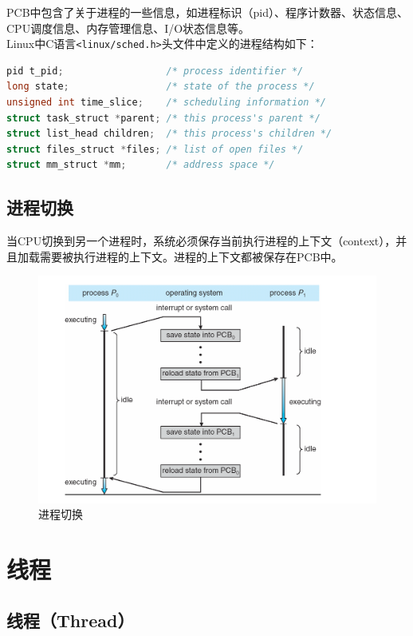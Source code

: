PCB中包含了关于进程的一些信息，如进程标识（pid）、程序计数器、状态信息、CPU调度信息、内存管理信息、I/O状态信息等。 \\

Linux中C语言\lstinline|<linux/sched.h>|头文件中定义的进程结构如下：

\begin{lstlisting}[language=C, title=进程结构]
pid t_pid;					/* process identifier */
long state;					/* state of the process */
unsigned int time_slice;	/* scheduling information */
struct task_struct *parent;	/* this process's parent */
struct list_head children;	/* this process's children */
struct files_struct *files;	/* list of open files */
struct mm_struct *mm;		/* address space */
\end{lstlisting}

\subsection{进程切换}

当CPU切换到另一个进程时，系统必须保存当前执行进程的上下文（context），并且加载需要被执行进程的上下文。进程的上下文都被保存在PCB中。

\begin{figure}[H]
	\centering
	\includegraphics[scale=0.5]{img/C2/2-2/1.png}
	\caption{进程切换}
\end{figure}

\newpage

\section{线程}

\subsection{线程（Thread）}

